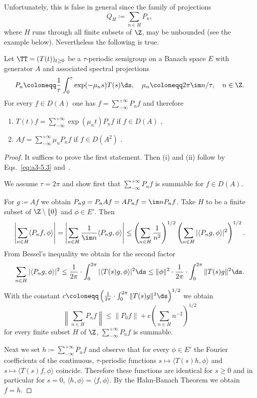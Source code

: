 Unfortunately, this is false in general since the family of projections
\[
Q_{H} \coloneqq \sum_{n \in H} P_{n} ,
\]
where $H$ runs through all finite subsets of\/ $\Z$, may be unbounded (see the example below).
Nevertheless the following is true.
\begin{theorem}\label{thm:a3-5.4}
Let $\TT = (T(t))_{t \geq 0}$ be a $\tau$-periodic semigroup on a Banach space $E$ with generator $A$ and associated spectral projections
\[
P_{n} \coloneqq  \frac{1}{\tau}\int_{0}^{\tau} \exp(-\mu_{n}s)T(s) \ds, \quad \mu_{n} \coloneqq 2\pi\im n/\tau, \quad n \in \Z  .
\]
For every $f \in D(A)$ one has $f = \sum_{-\infty}^{+\infty} P_{n}f$ and therefore
\begin{enumerate}[\upshape (i)]
\item 
$T(t)f = \sum_{-\infty}^{+\infty} \exp(\mu_{n}t)P_{n}f$ \quad if\/ $f \in D(A)$ ,

\item 
$Af = \sum_{-\infty}^{+\infty} \mu_{n}P_{n}f$ \quad if\/ $f \in D(A^{2})$ .
\end{enumerate}
\end{theorem}
\begin{proof}
It suffices to prove the first statement. Then (i) and (ii) follow by Eqs.~\eqref{eq:a3-5.3} and~.

We assume $\tau = 2\pi$ and show first that $\sum_{-\infty}^{+\infty} P_{n}f$ is summable for $f \in D(A)$.

For $g \coloneqq Af$ we obtain $P_{n}g = P_{n}Af = AP_{n}f = \im nP_{n}f$.
Take $H$ to be a finite subset of\/ $\Z \setminus \{0\}$ and $\phi \in E'$. Then
\[
\left|\sum_{n \in H} \langle P_{n}f,\phi \rangle\right|
= \left|\sum_{n \in H} \frac{1}{\im n} \langle P_{n}g,\phi \rangle\right| 
\leq \left(\sum_{n \in H} \frac{1}{n^2}\right)^{1/2}\left(\sum_{n \in H} |\langle P_{n}g,\phi \rangle|^{2}\right)^{1/2} .
\]
From Bessel's inequality we obtain for the second factor
\[
\sum_{n \in H} |\langle P_{n}g,\phi \rangle|^{2} \leq \frac{1}{2\pi} \cdot \int_{0}^{2\pi} |\langle T(s)g,\phi \rangle|^{2}  \ds 
\leq \|\phi\|^{2} \cdot \frac{1}{2\pi} \cdot \int_{0}^{2\pi} \|T(s)g\|^{2}  \ds  .
\]
With the constant $c \coloneqq \left(\frac{1}{2\pi} \cdot \int_{0}^{2\pi} \|T(s)g\|^{2} \ds\right)^{1/2}$ we obtain
\[
\left\|\sum_{n \in H} P_{n}f\right\| \leq \|P_{0} f\|+c\left(\sum_{n \in H} n^{-2}\right)^{1/2}
\]
for every finite subset $H$ of\/ $\Z$, \ie $\sum_{-\infty}^{+\infty} P_{n}f$ is summable.

Next we set $h \coloneqq \sum_{-\infty}^{+\infty} P_{n}f$ and observe that for every $\phi \in E'$ the Fourier coefficients of the continuous, $\tau$-periodic functions
$s \mapsto \langle T(s)h,\phi \rangle$ and $s \mapsto \langle T(s)f,\phi \rangle$
coincide.
Therefore these functions are identical for $s \geq 0$ and in particular for $s = 0$, \ie 
$\langle h, \phi \rangle = \langle f, \phi \rangle$.
By the Hahn-Banach Theorem we obtain $f = h$.
\end{proof}
